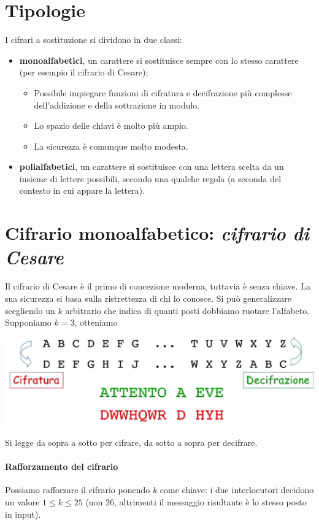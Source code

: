 \section{Tipologie}
I cifrari a sostituzione si dividono in due classi:
\begin{itemize}
	\item \textbf{monoalfabetici}, un carattere si sostituisce sempre con lo stesso carattere (per esempio il cifrario di Cesare);
	\begin{itemize}
		\item Possibile impiegare funzioni di cifratura e decifrazione più complesse dell'addizione e della sottrazione in modulo.
		\item Lo spazio delle chiavi è molto più ampio.
		\item La sicurezza è comunque molto modesta.
	\end{itemize} 
	\item \textbf{polialfabetici}, un carattere si sostituisce con una lettera scelta da un insieme di lettere possibili, secondo una qualche regola (a seconda del contesto in cui appare la lettera).
\end{itemize}
\section{Cifrario monoalfabetico: \emph{cifrario di Cesare}}
Il cifrario di Cesare è il primo di concezione moderna, tuttavia è senza chiave. La sua sicurezza si basa sulla ristrettezza di chi lo conosce. Si può generalizzare scegliendo un $k$ arbitrario che indica di quanti posti dobbiamo ruotare l'alfabeto. Supponiamo $k=3$, otteniamo
\begin{center}
	\includegraphics[scale=.45]{images/7.PNG}
\end{center}
Si legge da sopra a sotto per cifrare, da sotto a sopra per decifrare. 
\paragraph{Rafforzamento del cifrario} Possiamo rafforzare il cifrario ponendo $k$ come chiave: i due interlocutori decidono un valore $1 \leq k \leq 25$ (non $26$, altrimenti il messaggio risultante è lo stesso posto in input).
